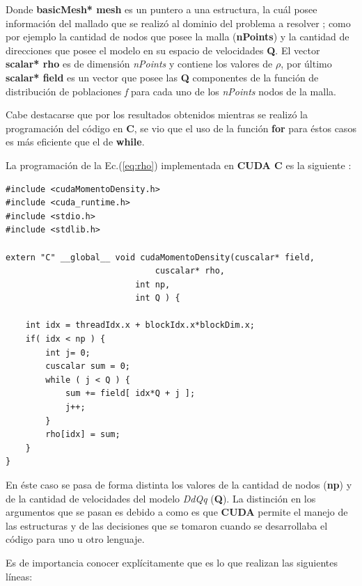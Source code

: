 Donde \textbf{basicMesh* mesh} es un puntero a una estructura, la cuál posee información del mallado que se realizó al dominio del problema a resolver ; como por ejemplo la cantidad de nodos que posee la malla (\textbf{nPoints}) y la cantidad de direcciones que posee el modelo en su espacio de velocidades \textbf{Q}. El vector  \textbf{scalar* rho} es de dimensión \textit{nPoints} y contiene los valores de $\rho$, por último \textbf{scalar* field} es un vector que posee las \textbf{Q} componentes de la función de distribución de poblaciones \textit{f} para cada uno de los  \textit{nPoints} nodos de la malla.

Cabe destacarse que por los resultados obtenidos mientras se realizó la programación del código en \textbf{C}, se vio que el uso de la función \textbf{for} para éstos casos es más eficiente que el de \textbf{while}.

La programación de la Ec.(\ref{eq:rho}) implementada en \textbf{CUDA C} es la siguiente :
\newpage

{\footnotesize
	\begin{frame}{}
		\begin{lstlisting}[frame=single]
#include <cudaMomentoDensity.h>
#include <cuda_runtime.h>
#include <stdio.h>
#include <stdlib.h>

extern "C" __global__ void cudaMomentoDensity(cuscalar* field,
				              cuscalar* rho,
					      int np,
					      int Q ) {
							
	int idx = threadIdx.x + blockIdx.x*blockDim.x;	
	if( idx < np ) {	
		int j= 0;		
		cuscalar sum = 0;		
		while ( j < Q ) {		
			sum += field[ idx*Q + j ];			
			j++;			
		}				
		rho[idx] = sum;	
	}
}		
		\end{lstlisting}
		
	\end{frame}
}

En éste caso se pasa de forma distinta los valores de la cantidad de nodos (\textbf{np}) y de la cantidad de velocidades del modelo \textit{DdQq} (\textbf{Q}). La distinción en los argumentos que se pasan es debido a como es que \textbf{CUDA} permite el manejo de las estructuras y de las decisiones que se tomaron cuando se desarrollaba el código para uno u otro lenguaje.

Es de importancia conocer explícitamente que es lo que realizan las siguientes líneas:

